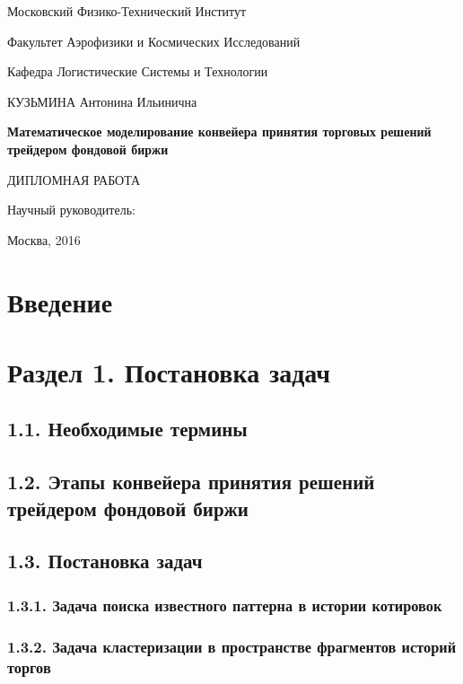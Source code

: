 \documentclass[12pt]{article}
\begin{document}
\thispagestyle{empty}
\begin{center}
\small{Московский Физико-Технический Институт

Факультет Аэрофизики и Космических Исследований

Кафедра Логистические Системы и Технологии}

\parskip=80pt
КУЗЬМИНА Антонина Ильинична
\parskip=30pt

\textbf{\large{Математическое моделирование конвейера принятия торговых решений трейдером фондовой биржи}}

ДИПЛОМНАЯ РАБОТА
\end{center}

\begin{flushright}
\parskip=50pt
Научный руководитель:
\end{flushright}

\vspace{\fill}
\begin{center}
Москва, 2016
\end{center}
\newpage{}
\tableofcontents{}
\newpage{}
\renewcommand\thesection{}
\renewcommand\thesubsection{}
\renewcommand\thesubsubsection{}
\section{Введение}
\section{Раздел 1. Постановка задач}
\subsection{1.1. Необходимые термины}
\subsection{1.2. Этапы конвейера принятия решений трейдером фондовой биржи}
\subsection{1.3. Постановка задач}
\subsubsection{1.3.1. Задача поиска известного паттерна в истории котировок}
\subsubsection{1.3.2. Задача кластеризации в пространстве фрагментов историй торгов}
\end{document}
